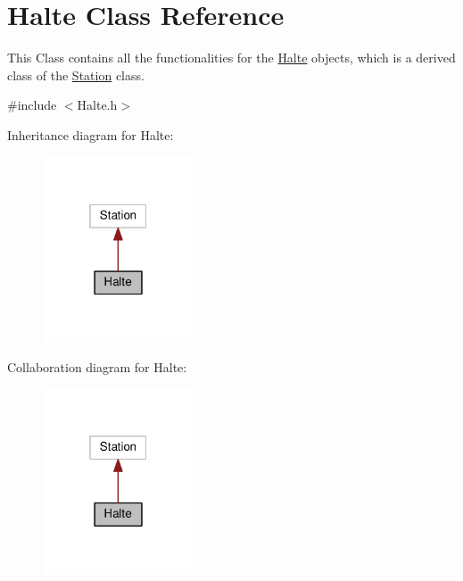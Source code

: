 \hypertarget{classHalte}{}\section{Halte Class Reference}
\label{classHalte}


This Class contains all the functionalities for the \hyperlink{classHalte}{Halte} objects, which is a derived class of the \hyperlink{classStation}{Station} class.  




{\ttfamily \#include $<$Halte.\+h$>$}



Inheritance diagram for Halte\+:\nopagebreak
\begin{figure}[H]
\begin{center}
\leavevmode
\includegraphics[width=127pt]{classHalte__inherit__graph}
\end{center}
\end{figure}


Collaboration diagram for Halte\+:\nopagebreak
\begin{figure}[H]
\begin{center}
\leavevmode
\includegraphics[width=127pt]{classHalte__coll__graph}
\end{center}
\end{figure}

